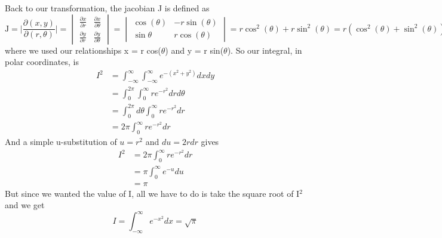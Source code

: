 \documentclass{article}
\newcommand{\be}{\begin{equation}}
\newcommand{\ee}{\end{equation}}
\begin{document}
Back to our transformation, the jacobian J is defined as
\be
\text{J} = \Big| \frac{\partial(x,y)}{\partial(r,\theta)} \Big |
=
\begin{vmatrix}
	\frac{\partial x}{\partial r} & \frac{\partial x}{\partial \theta} \\[6pt]
	\frac{\partial y}{\partial r} & \frac{\partial y}{\partial \theta}
\end{vmatrix}
=
\begin{vmatrix}
  \cos(\theta) & -r\sin(\theta) \\
	\sin{\theta} & r\cos(\theta)
\end{vmatrix}
= r \cos^2(\theta) + r \sin^2(\theta)  = r(\cos^2(\theta) + \sin^2(\theta)) = r
\ee
where we used our relationships x = r cos($\theta$) and y = r sin($\theta$).
So our integral, in polar coordinates, is
\be
\begin{split}
	 I^2 &= \int_{-\infty}^\infty \int_{-\infty}^\infty e^{-(x^2 + y^2)} dxdy \\
	 &= \int_0^{2\pi} \int_0^\infty r e^{-r^2} dr d\theta \\
	 &= \int_0^{2\pi} d\theta \int_0^\infty r e^{-r^2} dr \\
	 &= 2\pi \int_0^\infty re^{-r^2} dr
\end{split}
\ee
And a simple u-substitution of $u = r^2$ and $du = 2rdr$ gives
\be
\begin{split}
	 I^2 &= 2\pi \int_0^\infty re^{-r^2} dr \\
	 &= \pi \int_0^\infty e^{-u} du \\
	 &= \pi
\end{split}
\ee
But since we wanted the value of I, all we have to do is take the square root of I$^2$ and we get
\be
I = \int_{-\infty}^\infty e^{-x^2} dx = \sqrt{\pi}
\ee
\end{document}
